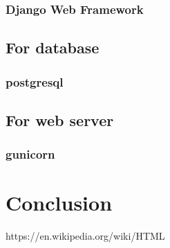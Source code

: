 \documentclass{article}
\begin{document}
	\subsubsection{Django Web Framework}
	\subsection{For database}
	\subsubsection{postgresql}
	\subsection{For web server}
	\subsubsection{gunicorn}
	\clearpage
	\section{Conclusion}
	
	\clearpage
	\begin{thebibliography}{9}
		https://en.wikipedia.org/wiki/HTML
	\end{thebibliography}
	
\end{document}
